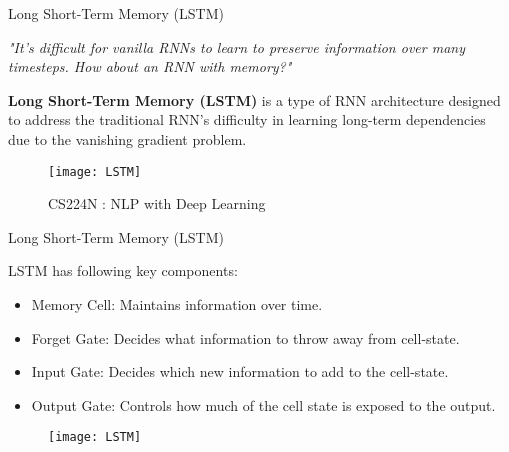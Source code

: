 \documentclass[10pt]{beamer}
\begin{document}
\begin{frame}[fragile]{Long Short-Term Memory (LSTM)}

	\textit{"It’s difficult for vanilla RNNs to learn to preserve information over many timesteps. How about an RNN with
		memory?"}

	\textbf{Long Short-Term Memory (LSTM)} is a type of RNN architecture designed to address the traditional RNN's
	difficulty in learning long-term dependencies due to the vanishing gradient problem.

	\begin{figure}[h]
		\centering
		\texttt{[image: LSTM]}
		\caption{CS224N : NLP with Deep Learning}
	\end{figure}

\end{frame}


\begin{frame}[fragile]{Long Short-Term Memory (LSTM)}

	LSTM has following key components:

	\begin{itemize}
		\item Memory Cell: Maintains information over time.
		\item Forget Gate: Decides what information to throw away from cell-state.
		\item Input Gate: Decides which new information to add to the cell-state.
		\item Output Gate: Controls how much of the cell state is exposed to the output.
	\end{itemize}

	\begin{figure}[h]
		\centering
		\texttt{[image: LSTM]}
	\end{figure}

\end{frame}

%
%
\end{document}
